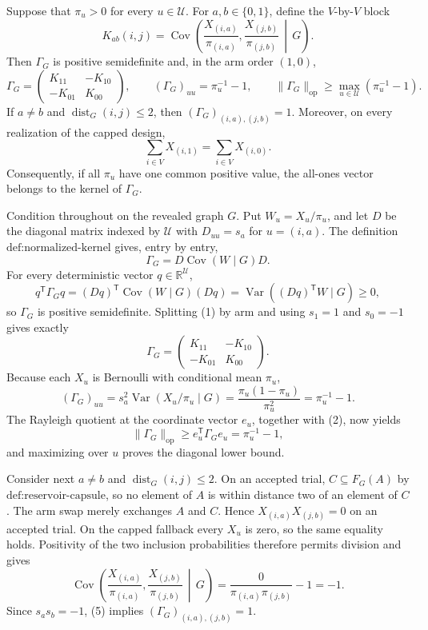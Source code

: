 Suppose that \(\pi_u>0\) for every \(u\in\mathcal U\).  For \(a,b\in\{0,1\}\), define the \(V\)-by-\(V\) block
\[
K_{ab}(i,j)=\operatorname{Cov}\!\left(
 \frac{X_{(i,a)}}{\pi_{(i,a)}},
 \frac{X_{(j,b)}}{\pi_{(j,b)}}\,\middle|\,G\right).
\]
Then \(\Gamma_G\) is positive semidefinite and, in the arm order \((1,0)\),
\[
\Gamma_G=
\begin{pmatrix}
K_{11}&-K_{10}\\
-K_{01}&K_{00}
\end{pmatrix},
\qquad
(\Gamma_G)_{uu}=\pi_u^{-1}-1,
\qquad
\|\Gamma_G\|_{\mathrm{op}}
 \ge \max_{u\in\mathcal U}(\pi_u^{-1}-1).
\]
If \(a\ne b\) and \(\operatorname{dist}_G(i,j)\le2\), then
\((\Gamma_G)_{(i,a),(j,b)}=1\).  Moreover, on every realization of the capped design,
\[
\sum_{i\in V}X_{(i,1)}=\sum_{i\in V}X_{(i,0)}.
\]
Consequently, if all \(\pi_u\) have one common positive value, the all-ones vector belongs to the kernel of \(\Gamma_G\).

Condition throughout on the revealed graph \(G\).  Put \(W_u=X_u/\pi_u\), and let \(D\) be the diagonal matrix indexed by \(\mathcal U\) with \(D_{uu}=s_a\) for \(u=(i,a)\).  The definition \(\text{def:normalized-kernel}\) gives, entry by entry,
\[
\Gamma_G=D\operatorname{Cov}(W\mid G)D. \tag{1}
\]
For every deterministic vector \(q\in\mathbb R^{\mathcal U}\),
\[
q^{\mathsf T}\Gamma_Gq
=(Dq)^{\mathsf T}\operatorname{Cov}(W\mid G)(Dq)
=\operatorname{Var}\!\left((Dq)^{\mathsf T}W\mid G\right)\ge0, \tag{2}
\]
so \(\Gamma_G\) is positive semidefinite.  Splitting (1) by arm and using \(s_1=1\) and \(s_0=-1\) gives exactly
\[
\Gamma_G=\begin{pmatrix}K_{11}&-K_{10}\\-K_{01}&K_{00}\end{pmatrix}. \tag{3}
\]
Because each \(X_u\) is Bernoulli with conditional mean \(\pi_u\),
\[
(\Gamma_G)_{uu}
=s_a^2\operatorname{Var}(X_u/\pi_u\mid G)
=\frac{\pi_u(1-\pi_u)}{\pi_u^2}
=\pi_u^{-1}-1. \tag{4}
\]
The Rayleigh quotient at the coordinate vector \(e_u\), together with (2), now yields
\[
\|\Gamma_G\|_{\mathrm{op}}
\ge e_u^{\mathsf T}\Gamma_Ge_u
=\pi_u^{-1}-1,
\]
and maximizing over \(u\) proves the diagonal lower bound.

Consider next \(a\ne b\) and \(\operatorname{dist}_G(i,j)\le2\).  On an accepted trial, \(C\subseteq F_G(A)\) by \(\text{def:reservoir-capsule}\), so no element of \(A\) is within distance two of an element of \(C\).  The arm swap merely exchanges \(A\) and \(C\).  Hence \(X_{(i,a)}X_{(j,b)}=0\) on an accepted trial.  On the capped fallback every \(X_u\) is zero, so the same equality holds.  Positivity of the two inclusion probabilities therefore permits division and gives
\[
\operatorname{Cov}\!\left(\frac{X_{(i,a)}}{\pi_{(i,a)}},
\frac{X_{(j,b)}}{\pi_{(j,b)}}\,\middle|\,G\right)
=\frac{0}{\pi_{(i,a)}\pi_{(j,b)}}-1=-1. \tag{5}
\]
Since \(s_as_b=-1\), (5) implies \((\Gamma_G)_{(i,a),(j,b)}=1\).

